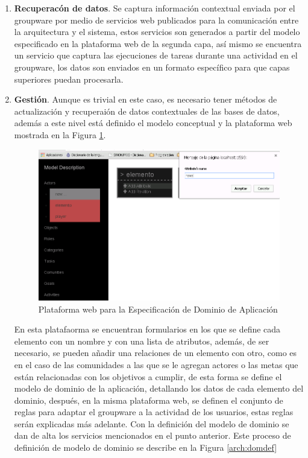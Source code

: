 \begin{enumerate}


\item \textbf{Recuperac\'on de datos}. Se captura informaci\'on contextual enviada por el groupware por medio de servicios web publicados para la comunicaci\'on entre la arquitectura y el sistema, estos servicios son generados a partir del modelo especificado en la plataforma web de la segunda capa, as\'i mismo se encuentra un servicio que captura las ejecuciones de tareas durante una actividad en el groupware, los datos son enviados en un formato espec\'ifico para que capas superiores puedan procesarla.

\item \textbf{Gesti\'on}. Aunque es trivial en este caso, es necesario tener m\'etodos de actualizaci\'on y recuperai\'on de datos contextuales de las bases de datos, adem\'as a este nivel est\'a definido el modelo conceptual y la plataforma web mostrada en la Figura \ref{arch:wplatform}.
\newpage
\begin{figure}[h!]
\centering
\includegraphics[scale=0.55]{images/attDef}
\caption{Plataforma web para la Especificaci\'on de Dominio de Aplicaci\'on}
\label{arch:wplatform}
\end{figure}

En esta platafaorma se encuentran formularios en los que se define cada elemento con un nombre y con una lista de atributos, adem\'as, de ser necesario, se pueden a\~nadir una relaciones de un elemento con otro, como es en el caso de las comunidades a las que se le agregan actores o las metas que est\'an relacionadas con los objetivos a cumplir, de esta forma se define el modelo de dominio de la aplicaci\'on, detallando los datos de cada elemento del dominio, despu\'es, en la misma plataforma web, se definen el conjunto de reglas para adaptar el groupware a la actividad de los usuarios, estas reglas ser\'an explicadas m\'as adelante. Con la definici\'on del modelo de dominio se dan de alta los servicios mencionados en el punto anterior. Este proceso de definici\'on de modelo de dominio se describe en la Figura \ref{arch:domdef}


\end{enumerate}
